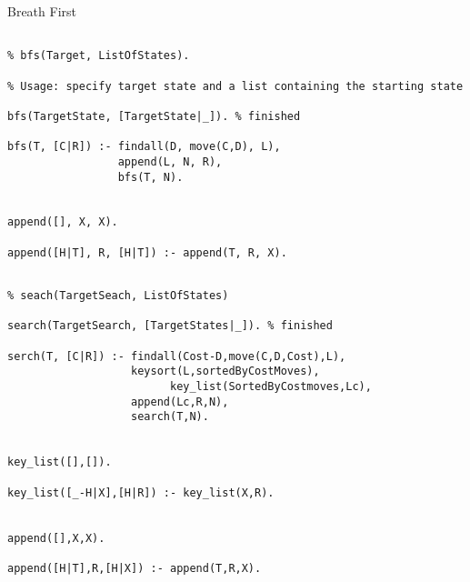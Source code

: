 \documentclass[a4paper,12pt]{article}
\begin{document}
Breath First

\begin{verbatim}

% bfs(Target, ListOfStates).

% Usage: specify target state and a list containing the starting state

bfs(TargetState, [TargetState|_]). % finished

bfs(T, [C|R]) :- findall(D, move(C,D), L),
                 append(L, N, R),
                 bfs(T, N).


append([], X, X).

append([H|T], R, [H|T]) :- append(T, R, X). 

\end{verbatim}

\begin{verbatim}

% seach(TargetSeach, ListOfStates)

search(TargetSearch, [TargetStates|_]). % finished

serch(T, [C|R]) :- findall(Cost-D,move(C,D,Cost),L),
                   keysort(L,sortedByCostMoves),
						 key_list(SortedByCostmoves,Lc),
                   append(Lc,R,N),
                   search(T,N).


key_list([],[]).

key_list([_-H|X],[H|R]) :- key_list(X,R).


append([],X,X).

append([H|T],R,[H|X]) :- append(T,R,X).

\end{verbatim}
\end{document}
